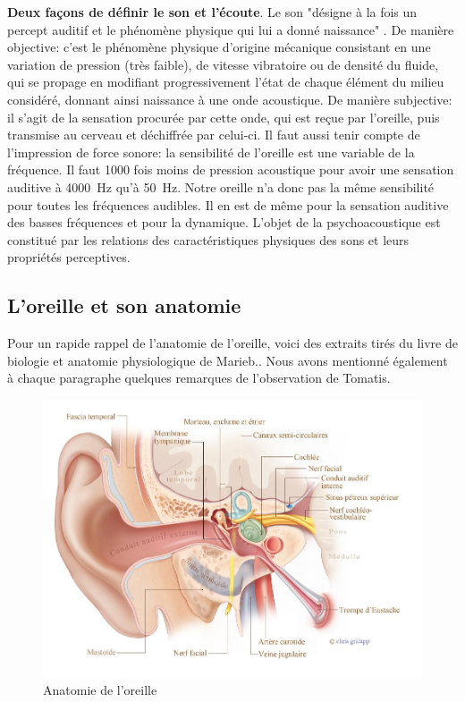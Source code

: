 \textbf{ Deux façons de définir le son et l'écoute}.
Le son "désigne à la fois un percept auditif et le phénomène physique qui lui a donné naissance" \autocite{doronparot}.
De manière objective:
c'est le phénomène phy\-si\-que
d'origine mécanique consistant en une variation de pression (très
faible), de vitesse vibratoire ou de densité du fluide, qui se propage
en modifiant progressivement l'état de chaque élément du milieu considéré,
donnant ainsi naissance à une onde acoustique.
De manière subjective:
	il s'agit de la sensation procurée
	par cette onde, qui est reçue par l'oreille, puis transmise au cerveau
	et déchiffrée par celui-ci. \autocite {futura-sciences}
Il faut aussi tenir compte de l'impression de force sonore: la sensibilité de l'oreille
est une variable de la fréquence. Il faut 1000 fois moins de pression
acoustique pour avoir une sensation auditive à \SI{4000}{\hertz} qu'à \SI{50}{\hertz}.
Notre oreille n'a donc pas la même sensibilité pour toutes
les fréquences audibles. Il en est de même pour la sensation auditive
des basses fréquences et pour la dynamique.
L'objet de la psychoacoustique est constitué par les relations des caractéristiques physiques des sons et 
leurs propriétés perceptives.




\subsection {L'oreille et son anatomie}


Pour un rapide rappel de l'anatomie de l'oreille, voici des extraits tirés du livre de biologie et anatomie
physiologique de  Marieb.\autocite {marieb:biologie}. Nous avons mentionné également à chaque 
paragraphe quelques  remarques de l'observation de Tomatis.
\begin{figure}
	\centering
	\includegraphics[width=0.7\linewidth]{images/20160624Berufsfeldgruppen.jpg}
	\caption[Anatomie oreille]{Anatomie de l'oreille}
	\label{fig:-20160624berufsfeldgruppen}
\end{figure}

